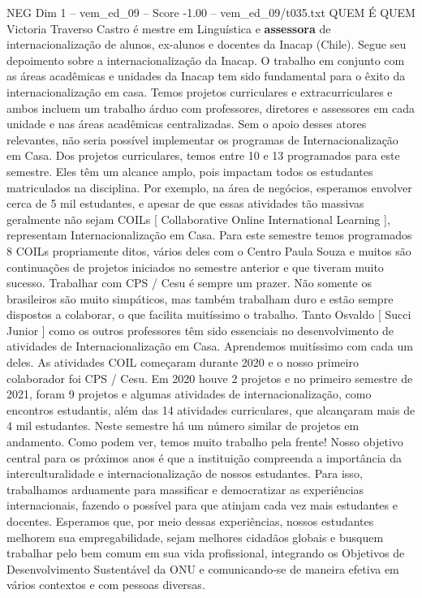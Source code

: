 \begin{textsample}{NEG Dim 1 – vem\_ed\_09 – Score -1.00 – vem\_ed\_09/t035.txt}  \label{ex:f1_neg_013}
QUEM É QUEM Victoria Traverso Castro é mestre em Linguística e \textbf{assessora} de internacionalização de alunos, ex-alunos e docentes da Inacap (Chile).
Segue seu depoimento sobre a internacionalização da Inacap.
O trabalho em conjunto com as áreas acadêmicas e unidades da Inacap tem sido fundamental para o êxito da internacionalização em casa.
Temos projetos curriculares e extracurriculares e ambos incluem um trabalho árduo com professores, diretores e assessores em cada unidade e nas áreas acadêmicas centralizadas.
Sem o apoio desses atores relevantes, não seria possível implementar os programas de Internacionalização em Casa.
Dos projetos curriculares, temos entre 10 e 13 programados para este semestre.
Eles têm um alcance amplo, pois impactam todos os estudantes matriculados na disciplina.
Por exemplo, na área de negócios, esperamos envolver cerca de 5 mil estudantes, e apesar de que essas atividades tão massivas geralmente não sejam COILs [ Collaborative Online International Learning ], representam Internacionalização em Casa.
Para este semestre temos programados 8 COILs propriamente ditos, vários deles com o Centro Paula Souza e muitos são continuações de projetos iniciados no semestre anterior e que tiveram muito sucesso.
Trabalhar com CPS / Cesu é sempre um prazer.
Não somente os brasileiros são muito simpáticos, mas também trabalham duro e estão sempre dispostos a colaborar, o que facilita muitíssimo o trabalho.
Tanto Osvaldo [ Succi Junior ] como os outros professores têm sido essenciais no desenvolvimento de atividades de Internacionalização em Casa.
Aprendemos muitíssimo com cada um deles.
As atividades COIL começaram durante 2020 e o nosso primeiro colaborador foi CPS / Cesu.
Em 2020 houve 2 projetos e no primeiro semestre de 2021, foram 9 projetos e algumas atividades de internacionalização, como encontros estudantis, além das 14 atividades curriculares, que alcançaram mais de 4 mil estudantes.
Neste semestre há um número similar de projetos em andamento.
Como podem ver, temos muito trabalho pela frente!
Nosso objetivo central para os próximos anos é que a instituição compreenda a importância da interculturalidade e internacionalização de nossos estudantes.
Para isso, trabalhamos arduamente para massificar e democratizar as experiências internacionais, fazendo o possível para que atinjam cada vez mais estudantes e docentes.
Esperamos que, por meio dessas experiências, nossos estudantes melhorem sua empregabilidade, sejam melhores cidadãos globais e busquem trabalhar pelo bem comum em sua vida profissional, integrando os Objetivos de Desenvolvimento Sustentável da ONU e comunicando-se de maneira efetiva em vários contextos e com pessoas diversas.

\end{textsample}
